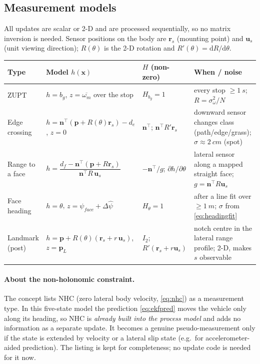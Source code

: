 \documentclass[11pt,a4paper]{article}
\newcommand{\T}{^{\!\top}}
\newcommand{\vect}[1]{\bm{#1}}
\begin{document}
\subsection{Measurement models}\label{sec:meas}

All updates are scalar or 2-D and are processed sequentially, so no matrix
inversion is needed. Sensor positions on the body are $\vect r_s$ (mounting
point) and $\vect u_s$ (unit viewing direction); $R(\theta)$ is the 2-D rotation
and $R'(\theta)=\mathrm dR/\mathrm d\theta$.

\begin{center}
\small
\begin{tabularx}{\textwidth}{@{}lp{40mm}p{37mm}L@{}}
\toprule
\textbf{Type} & \textbf{Model $h(\vect x)$} & \textbf{$H$ (non-zero)} & \textbf{When / noise}\\
\midrule
ZUPT & $h=b_g$, $z=\overline{\omega_m}$ over the stop & $H_{b_g}=1$ & every stop $\geq\qty{1}{s}$; $R=\sigma_\omega^2/N$\\
Edge crossing & $h=\vect n\T(\vect p+R(\theta)\vect r_s)-d_e$, $z=0$ & $\vect n\T$; $\vect n\T R'\vect r_s$ & downward sensor changes class (path/edge/grass); $\sigma\approx\qty{2}{cm}$ (spot)\\
Range to a face & $h=\dfrac{d_f-\vect n\T(\vect p+R\vect r_s)}{\vect n\T R\,\vect u_s}$ & $-\vect n\T/g$; $\partial h/\partial\theta$ & lateral sensor along a mapped straight face; $g=\vect n\T R\vect u_s$\\
Face heading & $h=\theta$, $z=\psi_{face}+\Delta\hat\psi$ & $H_\theta=1$ & after a line fit over $\geq\qty{1}{m}$; $\sigma$ from \cref{eq:headingfit}\\
Landmark (post) & $h=\vect p+R(\theta)(\vect r_s+r\,\vect u_s)$, $z=\vect p_L$ & $I_2$; $R'(\vect r_s+r\vect u_s)$ & notch centre in the lateral range profile; 2-D, makes $s$ observable\\
\bottomrule
\end{tabularx}
\end{center}

\paragraph{About the non-holonomic constraint.} The concept lists NHC (zero
lateral body velocity, \cref{eq:nhc}) as a measurement type. In this five-state
model the prediction \cref{eq:ekfpred} moves the vehicle only along its heading,
so NHC is \emph{already built into the process model} and adds no information as
a separate update. It becomes a genuine pseudo-measurement only if the state is
extended by velocity or a lateral slip state (e.g.\ for accelerometer-aided
prediction). The listing is kept for completeness; no update code is needed for
it now.
\end{document}
